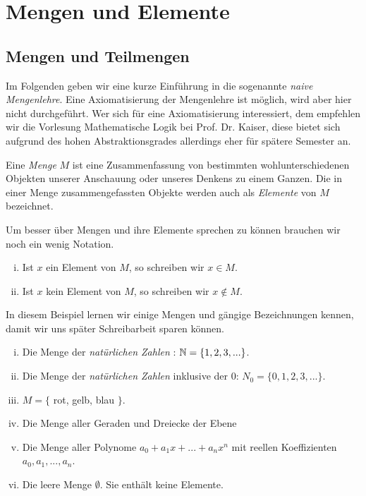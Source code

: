 \chapter{Mengen und Elemente}

\section{Mengen und Teilmengen}
Im Folgenden geben wir eine kurze Einführung in die sogenannte \textit{naive Mengenlehre}. Eine Axiomatisierung der Mengenlehre ist möglich, wird aber hier nicht durchgeführt. 
Wer sich für eine Axiomatisierung interessiert, dem empfehlen wir die Vorlesung \glqq Mathematische Logik \grqq bei Prof. Dr. Kaiser, diese bietet sich aufgrund des hohen Abstraktionsgrades allerdings eher für spätere Semester an. 

\begin{mydef}
    Eine \textit{Menge} $M$ ist eine Zusammenfassung von bestimmten wohlunterschiedenen Objekten unserer Anschauung oder unseres Denkens zu einem Ganzen. 
    Die in einer Menge zusammengefassten Objekte werden auch als \textit{Elemente} von $M$ bezeichnet. 
\end{mydef}

\begin{remark}
    Um besser über Mengen und ihre Elemente sprechen zu können brauchen wir noch ein wenig Notation. 
    \begin{enumerate}[(i)]
        \item 
        Ist $x$ ein Element von $M$, so schreiben wir $x \in M$. 
        \item 
        Ist $x$ kein Element von $M$, so schreiben wir $x \notin M$. 
    \end{enumerate}
\end{remark}

\begin{example}
    In diesem Beispiel lernen wir einige Mengen und gängige Bezeichnungen kennen, damit wir uns später Schreibarbeit sparen können. 
    \begin{enumerate}[(i)]
        \item 
        Die Menge der \textit{natürlichen Zahlen} : $\mathbb{N} = \{1,2,3,...\}$.
        \item 
        Die Menge der \textit{natürlichen Zahlen} inklusive der $0$: $N_0 = \{0,1,2,3,...\}$. 
        \item 
        $M = \{$ rot, gelb, blau $\}$. 
        \item 
        Die Menge aller Geraden und Dreiecke der Ebene
        \item 
        Die Menge aller Polynome $a_0 + a_1 x + ... + a_n x^n$ mit reellen Koeffizienten $a_0,a_1,...,a_n$. 
        \item 
        Die leere Menge $\emptyset$. Sie enthält keine Elemente. 
    \end{enumerate}
\end{example}

